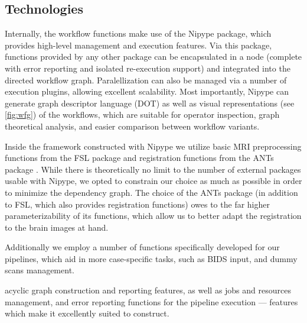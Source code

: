 \subsection{Technologies}

Internally, the workflow functions make use of the Nipype \cite{nipype} package, which provides high-level management and execution features.
Via this package, functions provided by any other package can be encapsulated in a node (complete with error reporting and isolated re-execution support) and integrated into the directed workflow graph.
Paralellization can also be managed via a number of execution plugins, allowing excellent scalability.
Most importantly, Nipype can generate graph descriptor language (DOT) as well as visual representations (see \cref{fig:wfg}) of the workflows, which are suitable for operator inspection, graph theoretical analysis, and easier comparison between workflow variants.

Inside the framework constructed with Nipype we utilize basic MRI preprocessing functions from the FSL package \cite{fsl} and registration functions from the ANTs package \cite{ants}.
While there is theoretically no limit to the number of external packages usable with Nipype, we opted to constrain our choice as much as possible in order to minimize the dependency graph.
The choice of the ANTs package (in addition to FSL, which also provides registration functions) owes to the far higher parameterizability of its functions, which allow us to better adapt the registration to the brain images at hand.

Additionally we employ a number of functions specifically developed for our pipelines, which aid in more case-specific tasks, such as BIDS \cite{bids} input, and dummy scans management.

acyclic graph construction and reporting features, as well as jobs and resources management, and error reporting functions for the pipeline execution --- features which make it excellently suited to construct. 

